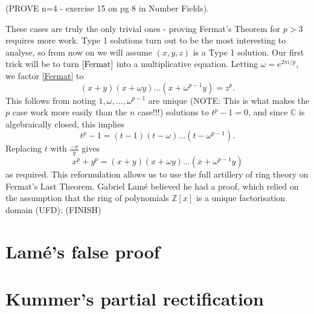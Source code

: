 (PROVE n=4 - exercise 15 on pg 8 in Number Fields).

These cases are truly the only trivial ones - proving Fermat's Theorem for $p>3$ requires more work. Type 1 solutions turn out to be the most interesting to analyse, so from now on we will assume $(x,y,z)$ is a Type 1 solution. Our first trick will be to turn $\cref{Fermat}$ into a multiplicative equation. Letting $\omega=e^{2\pi i/p}$, we factor \cref{Fermat} to
$$(x+y)(x+\omega y)\dots(x+\omega^{p-1} y)=z^p.$$
This follows from noting $1,\omega,\dots,\omega^{p-1}$ are unique (NOTE: This is what makes the $p$ case work more easily than the $n$ case!!!) solutions to $t^p-1=0$, and since $\mathbb{C}$ is algebraically closed, this implies
\begin{equation}\label{eq-omega-polynomial}t^p-1=(t-1)(t-\omega)\dots (t-\omega^{p-1}).\end{equation}
Replacing $t$ with $\frac{-x}{y}$ gives
$$x^p+y^p=(x+y)(x+\omega y)\dots (x+\omega^{p-1}y)$$
as required. This reformulation allows us to use the full artillery of ring theory on Fermat's Last Theorem.
Gabriel Lamé believed he had a proof, which relied on the assumption that the ring of polynomials $\mathbb{Z}[x]$ is a unique factorisation domain (UFD): (FINISH)

\section{Lamé's false proof}

\section{Kummer's partial rectification}
